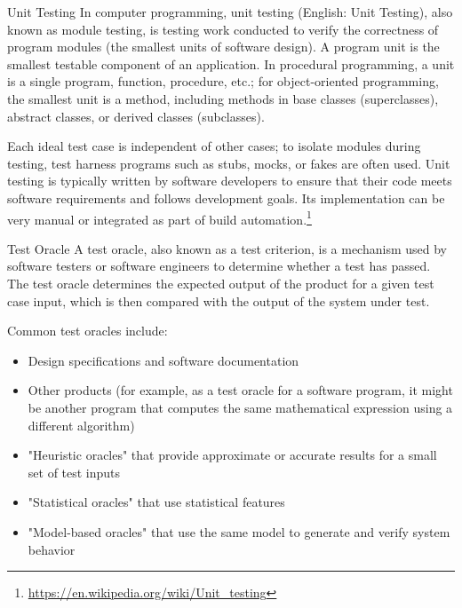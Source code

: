 \documentclass{beamer}
\begin{document}
\begin{frame}[t]{Unit Testing}
In computer programming, unit testing (English: Unit Testing), also known as module testing, is testing work conducted to verify the correctness of program modules (the smallest units of software design). A program unit is the smallest testable component of an application. In procedural programming, a unit is a single program, function, procedure, etc.; for object-oriented programming, the smallest unit is a method, including methods in base classes (superclasses), abstract classes, or derived classes (subclasses).

Each ideal test case is independent of other cases; to isolate modules during testing, test harness programs such as stubs, mocks, or fakes are often used. Unit testing is typically written by software developers to ensure that their code meets software requirements and follows development goals. Its implementation can be very manual or integrated as part of build automation.\footnote{\url{https://en.wikipedia.org/wiki/Unit_testing}}
\end{frame}

\begin{frame}[t]{Test Oracle}
A test oracle, also known as a test criterion, is a mechanism used by software testers or software engineers to determine whether a test has passed. The test oracle determines the expected output of the product for a given test case input, which is then compared with the output of the system under test.

Common test oracles include:

\begin{itemize}
    \item Design specifications and software documentation
    \item Other products (for example, as a test oracle for a software program, it might be another program that computes the same mathematical expression using a different algorithm)
    \item "Heuristic oracles" that provide approximate or accurate results for a small set of test inputs
    \item "Statistical oracles" that use statistical features
    \item "Model-based oracles" that use the same model to generate and verify system behavior
\end{itemize}
\end{frame}
\end{document}
